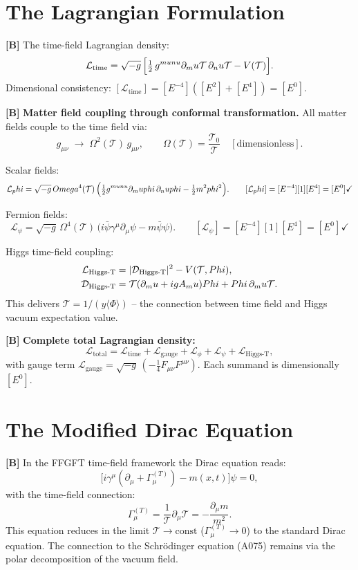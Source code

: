 \section{The Lagrangian Formulation}

\textbf{[B]} The time-field Lagrangian density:
\[
  \mathcal L_\text{time}
  = \sqrt{-g}\,\Bigl[
    \tfrac12\,g^{\mu\nu}\partial_\mu\mathcal T\,\partial_\nu\mathcal T
    - V(\mathcal T)
  \Bigr].
\]
Dimensional consistency: $[\mathcal L_\text{time}]=[E^{-4}]([E^2]+[E^4])=[E^0]$.

\textbf{[B]} \textbf{Matter field coupling through conformal transformation.} All
matter fields couple to the time field via:
\[
  g_{\mu\nu}\;\to\;\Omega^2(\mathcal T)\,g_{\mu\nu},
  \qquad\Omega(\mathcal T)=\frac{\mathcal T_0}{\mathcal T}\quad[\text{dimensionless}].
\]

Scalar fields:
\[
  \mathcal L_\phi
  = \sqrt{-g}\,\Omega^4(\mathcal T)\,
    \Bigl(\tfrac12 g^{\mu\nu}\partial_\mu\phi\,\partial_\nu\phi
    - \tfrac12 m^2\phi^2\Bigr).
  \qquad [\mathcal L_\phi]=[E^{-4}][1][E^4]=[E^0]\checkmark
\]

Fermion fields:
\[
  \mathcal L_\psi
  = \sqrt{-g}\,\Omega^4(\mathcal T)\,
    \bigl(i\bar\psi\gamma^\mu\partial_\mu\psi - m\bar\psi\psi\bigr).
  \qquad [\mathcal L_\psi]=[E^{-4}][1][E^4]=[E^0]\checkmark
\]

Higgs time-field coupling:
\begin{align}
  \mathcal L_{\text{Higgs-T}}
  &= |\mathcal D_{\text{Higgs-T}}|^2 - V(\mathcal T,\Phi), \notag\\
  \mathcal D_{\text{Higgs-T}}
  &= \mathcal T(\partial_\mu+igA_\mu)\Phi + \Phi\,\partial_\mu\mathcal T. \notag
\end{align}
This delivers $\mathcal T=1/(y\langle\Phi\rangle)$ -- the connection between
time field and Higgs vacuum expectation value.

\textbf{[B]} \textbf{Complete total Lagrangian density:}
\[
  \mathcal L_\text{total}
  = \mathcal L_\text{time}
  + \mathcal L_\text{gauge}
  + \mathcal L_\phi
  + \mathcal L_\psi
  + \mathcal L_{\text{Higgs-T}},
\]
with gauge term $\mathcal L_\text{gauge}=\sqrt{-g}\,(-\tfrac14 F_{\mu\nu}F^{\mu\nu})$.
Each summand is dimensionally $[E^0]$.

\section{The Modified Dirac Equation}

\textbf{[B]} In the FFGFT time-field framework the Dirac equation reads:
\[
  \bigl[i\gamma^\mu(\partial_\mu+\Gamma_\mu^{(T)})-m(x,t)\bigr]\psi=0,
\]
with the time-field connection:
\[
  \Gamma_\mu^{(T)}
  = \frac{1}{\mathcal T}\partial_\mu\mathcal T
  = -\frac{\partial_\mu m}{m^2}.
\]
This equation reduces in the limit $\mathcal T\to\text{const}$
($\Gamma_\mu^{(T)}\to0$) to the standard Dirac equation. The connection to the
Schrödinger equation (A075) remains via the polar decomposition of the vacuum
field.


